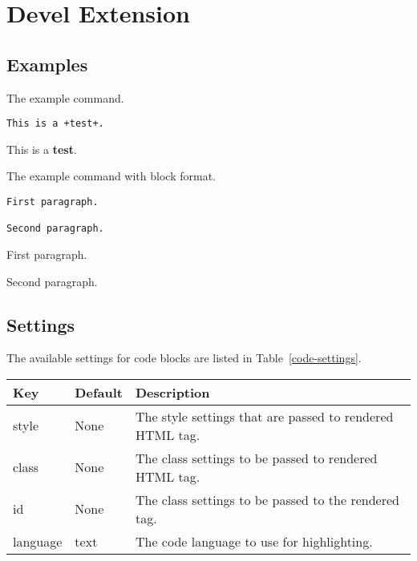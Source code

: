 
\chapter{\label{devel-extension}Devel Extension}
\section{\label{examples}Examples}
\begin{example}[label=markdown-example]{The example command.}

\begin{verbatim}
This is a +test+.
\end{verbatim}

\tcblower
\par This is a \textbf{test}.
\end{example}

\begin{example}[label=markdown-example2]{The example command with block format.}

\begin{verbatim}
First paragraph.

Second paragraph.
\end{verbatim}

\tcblower
\par First paragraph.
\par Second paragraph. 
\end{example}

\section{\label{settings}Settings}
\par The available settings for code blocks are listed in Table~\ref{code-settings}.\par\begin{tabulary}{\textwidth}{LLL}
\toprule
Key &Default &Description \\
\midrule
style &None &The style settings that are passed to rendered HTML tag. \\
class &None &The class settings to be passed to rendered HTML tag. \\
id &None &The class settings to be passed to the rendered tag. \\
language &text &The code language to use for highlighting. \\
\bottomrule
\end{tabulary}

